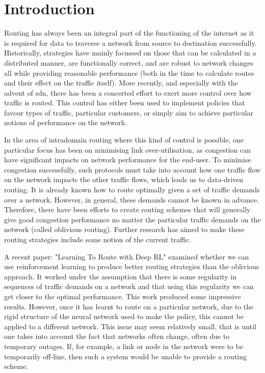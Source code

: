 \chapter{Introduction}

\setcounter{page}{1}

Routing has always been an integral part of the functioning of the internet as it is required for data to traverse a network from source to destination successfully. Historically, strategies have mainly focussed on those that can be calculated in a distributed manner, are functionally correct, and are robust to network changes all while providing reasonable performance (both in the time to calculate routes and their effect on the traffic itself). More recently, and especially with the advent of \ac{sdn}, there has been a concerted effort to exert more control over how traffic is routed. This control has either been used to implement policies that favour types of traffic, particular customers, or simply aim to achieve particular notions of performance on the network.

In the area of intradomain routing where this kind of control is possible, one particular focus has been on minimising link over-utilisation, as congestion can have significant impacts on network performance for the end-user. To minimise congestion successfully, such protocols must take into account how one traffic flow on the network impacts the other traffic flows, which leads us to data-driven routing. It is already known how to route optimally given a set of traffic demands over a network. However, in general, these demands cannot be known in advance. Therefore, there have been efforts to create routing schemes that will generally give good congestion performance no matter the particular traffic demands on the network (called oblivious routing). Further research has aimed to make these routing strategies include some notion of the current traffic.

A recent paper: "Learning To Route with Deep RL" examined whether we can use reinforcement learning to produce better routing strategies than the oblivious approach. It worked under the assumption that there is some regularity in sequences of traffic demands on a network and that using this regularity we can get closer to the optimal performance. This work produced some impressive results. However, once it has learnt to route on a particular network, due to the rigid structure of the neural network used to make the policy, this cannot be applied to a different network. This issue may seem relatively small, that is until one takes into account the fact that networks often change, often due to temporary outages. If, for example, a link or node in the network were to be temporarily off-line, then such a system would be unable to provide a routing scheme.

